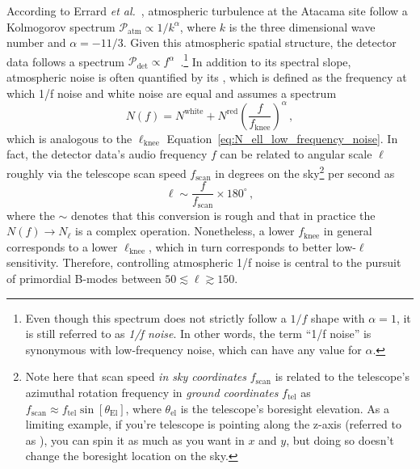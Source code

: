 According to Errard \textit{et al.}~\cite{errard_modeling_2015}, atmospheric turbulence at the Atacama site follow a Kolmogorov spectrum $\mathcal{P}_{\mathrm{atm}} \propto 1 / k^{\alpha}$, where $k$ is the three dimensional wave number and $\alpha = -11/3$. Given this atmospheric spatial structure, the detector data follows a spectrum 
$\mathcal{P}_{\mathrm{det}} \propto f^{\alpha}$~\cite{errard_modeling_2015}.\footnote{Even though this spectrum does not strictly follow a $1 / f$ shape with $\alpha = 1$, it is still referred to as \textit{1/f noise}. In other words, the term ``1/f noise'' is synonymous with low-frequency noise, which can have any value for $\alpha$.} In addition to its spectral slope, atmospheric noise is often quantified by its , which is defined as the frequency at which 1/f noise and white noise are equal and assumes a spectrum
\begin{equation}
    N(f) = N^{\mathrm{white}} + N^{\mathrm{red}} \left( \frac{f}{f_{\mathrm{knee}}} \right)^{\alpha} \, ,
    \label{eq:1/f_knee}
\end{equation}
which is analogous to the $\ell_{\mathrm{knee}}$ Equation~\ref{eq:N_ell_low_frequency_noise}. In fact, the detector data's audio frequency $f$ can be related to angular scale $\ell$ roughly via the telescope scan speed $f_{\mathrm{scan}}$ in degrees on the sky\footnote{Note here that scan speed \textit{in sky coordinates} $f_{\mathrm{scan}}$ is related to the telescope's azimuthal rotation frequency in \textit{ground coordinates} $f_{\mathrm{tel}}$ as $f_{\mathrm{scan}} \approx f_{\mathrm{tel}} \sin[\theta_{\mathrm{El}}]$, where $\theta_{\mathrm{el}}$ is the telescope's boresight elevation. As a limiting example, if you're telescope is pointing along the z-axis (referred to as ), you can spin it as much as you want in $x$ and $y$, but doing so doesn't change the boresight location on the sky.} per second as
\begin{equation}
    \ell \sim \frac{f}{f_{\mathrm{scan}}} \times 180^{\circ} \, ,
    \label{eq:scan_speed_to_ell}
\end{equation}
where the $\sim$ denotes that this conversion is rough and that in practice the $N(f) \rightarrow N_{\ell}$  is a complex operation. Nonetheless, a lower $f_{\mathrm{knee}}$ in general corresponds to a lower $\ell_{\mathrm{knee}}$, which in turn corresponds to better low-$\ell$ sensitivity. Therefore, controlling atmospheric 1/f noise is central to the pursuit of primordial B-modes between $50 \lesssim \ell \gtrsim 150$. 

